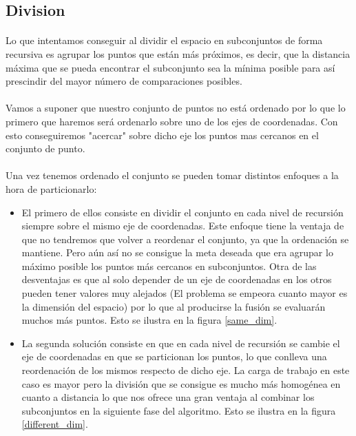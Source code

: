 \documentclass{article}
\begin{document}
	\subsection{Division}
		
		\paragraph{}
		Lo que intentamos conseguir al dividir el espacio en subconjuntos de forma recursiva es agrupar los puntos que están más próximos, es decir, que la distancia máxima que se pueda encontrar el subconjunto sea la mínima posible para así prescindir del mayor número de comparaciones posibles. 
		
		\paragraph{}
		Vamos a suponer que nuestro conjunto de puntos no está ordenado por lo que lo primero que haremos será ordenarlo sobre uno de los ejes de coordenadas. Con esto conseguiremos "acercar" sobre dicho eje los puntos mas cercanos en el conjunto de punto.
		
		\paragraph{}
		Una vez tenemos ordenado el conjunto se pueden tomar distintos enfoques a la hora de particionarlo:
		
		\begin{itemize}

			\item
			El primero de ellos consiste en dividir el conjunto en cada nivel de recursión siempre sobre el mismo eje de coordenadas. Este enfoque tiene la ventaja de que no tendremos que volver a reordenar el conjunto, ya que la ordenación se mantiene. Pero aún así no se consigue la meta deseada que era agrupar lo máximo posible los puntos más cercanos en subconjuntos. Otra de las desventajas es que al solo depender de un eje de coordenadas en los otros pueden tener valores muy alejados (El problema se empeora cuanto mayor es la dimensión del espacio) por lo que al producirse la fusión se evaluarán muchos más puntos. Esto se ilustra en la figura \ref{same_dim}.

			\item
			La segunda solución consiste en que en cada nivel de recursión se cambie el eje de coordenadas en que se particionan los puntos, lo que conlleva una reordenación de los mismos respecto de dicho eje. La carga de trabajo en este caso es mayor pero la división que se consigue es mucho más homogénea en cuanto a distancia lo que nos ofrece una gran ventaja al combinar los subconjuntos en la siguiente fase del algoritmo. Esto se ilustra en la figura \ref{different_dim}.

		\end{itemize}
		
\end{document}
